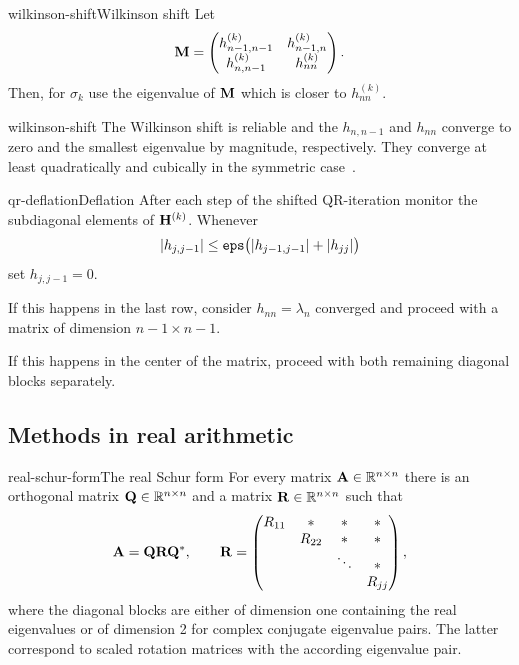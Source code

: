 \begin{Definition*}{wilkinson-shift}{Wilkinson shift}
  Let
  \begin{gather}
    \mathbf M =
    \begin{pmatrix}
      h_{n-1,n-1}^{(k)}&h_{n-1,n}^{(k)}\\h_{n,n-1}^{(k)}&h_{nn}^{(k)}
    \end{pmatrix}.
  \end{gather}
  Then, for $\sigma_k$ use the eigenvalue of $\mathbf M$ which is closer
  to $h_{nn}^{(k)}$.
\end{Definition*}

\begin{Remark}{wilkinson-shift}
  The Wilkinson shift is reliable and the $h_{n,n-1}$ and $h_{nn}$
  converge to zero and the smallest eigenvalue by magnitude,
  respectively. They converge at least quadratically and cubically in
  the symmetric case~\cite[Section 8.2]{GolubVanLoan83}.
\end{Remark}

\begin{Algorithm*}{qr-deflation}{Deflation}
  After each step of the shifted QR-iteration monitor the subdiagonal
  elements of $\mathbf H^{(k)}$. Whenever
  \begin{gather}
    \lvert h_{j,j-1}\rvert \le \texttt{eps} \bigl(\lvert h_{j-1,j-1}\rvert+\lvert h_{jj}\rvert\bigr)
  \end{gather}
  set $h_{j,j-1}=0$.

  If this happens in the last row, consider $h_{nn}=\lambda_n$
  converged and proceed with a matrix of dimension $n-1\times n-1$.

  If this happens in the center of the matrix, proceed with both
  remaining diagonal blocks separately.
\end{Algorithm*}


\subsection{Methods in real arithmetic}

\begin{Theorem*}{real-schur-form}{The real Schur form}
  For every matrix $\mathbf A\in \mathbb R^{n\times n}$ there is an orthogonal matrix
  $\mathbf Q\in\mathbb R^{n\times n}$ and a matrix $\mathbf R\in\mathbb R^{n\times n}$ such that
  \begin{gather}
    \mathbf A = \mathbf Q\mathbf R\mathbf Q^*,
    \qquad
    \mathbf R =
    \begin{pmatrix}
      R_{11} &* & *&*\\
      &R_{22}&*&*\\
      &&\ddots&*\\
      &&& R_{jj}
    \end{pmatrix},
  \end{gather}
  where the diagonal blocks are either of dimension one containing the
  real eigenvalues or of dimension 2 for complex conjugate eigenvalue
  pairs. The latter correspond to scaled rotation matrices with the
  according eigenvalue pair.
\end{Theorem*}

